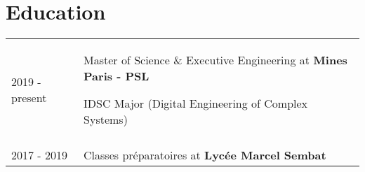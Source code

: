 \documentclass[a4paper,12pt]{article}
\begin{document}
\section{Education}
\begin{tabularx}{\linewidth}{@{}l X@{}}	
2019 - present & Master of Science \& Executive Engineering  at \textbf{Mines Paris - PSL} %

IDSC Major (Digital Engineering of Complex Systems) \\
\\
2017 - 2019 & Classes préparatoires at \textbf{Lycée Marcel Sembat} %
\end{tabularx}
\end{document}
